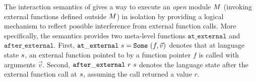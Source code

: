 
The interaction semantics of \ccc{} gives a way to execute an
\emph{open} module $M$ (\ie invoking external functions defined
outside $M$) in isolation by providing a logical mechanism to
reflect possible interference from external function calls. More
specifically, the semantics provides two meta-level functions
$\mathtt{at\_external}$ and $\mathtt{after\_external}$. First,
$\mathtt{at\_external}~s = \mathtt{Some}~(f,\vec{v})$ denotes that
at language state $s$, an external function pointed to by a
function pointer $f$ is called with arguments $\vec{v}$. Second,
$\mathtt{after\_external}~r~s$ denotes the language state after the
external function call at $s$, assuming the call returned a value
$r$.


